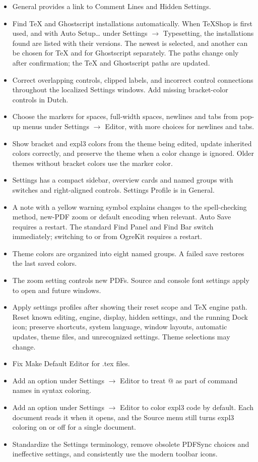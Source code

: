 \documentclass[11pt,letterpaper]{article}
\begin{document}
\begin{itemize}
\item General provides a link to Comment Lines and Hidden Settings.
\item Find TeX and Ghostscript installations automatically. When TeXShop is first used, and with Auto Setup… under Settings \(\rightarrow\) Typesetting, the installations found are listed with their versions. The newest is selected, and another can be chosen for TeX and for Ghostscript separately. The paths change only after confirmation; the TeX and Ghostscript paths are updated.
\item Correct overlapping controls, clipped labels, and incorrect control connections throughout the localized Settings windows. Add missing bracket-color controls in Dutch.
\item Choose the markers for spaces, full-width spaces, newlines and tabs from pop-up menus under Settings \(\rightarrow\) Editor, with more choices for newlines and tabs.
\item Show bracket and expl3 colors from the theme being edited, update inherited colors correctly, and preserve the theme when a color change is ignored. Older themes without bracket colors use the marker color.
\item Settings has a compact sidebar, overview cards and named groups with switches and right-aligned controls. Settings Profile is in General.
\item A note with a yellow warning symbol explains changes to the spell-checking method, new-PDF zoom or default encoding when relevant. Auto Save requires a restart. The standard Find Panel and Find Bar switch immediately; switching to or from OgreKit requires a restart.
\item Theme colors are organized into eight named groups. A failed save restores the last saved colors.
\item The zoom setting controls new PDFs. Source and console font settings apply to open and future windows.
\item Apply settings profiles after showing their reset scope and TeX engine path. Reset known editing, engine, display, hidden settings, and the running Dock icon; preserve shortcuts, system language, window layouts, automatic updates, theme files, and unrecognized settings. Theme selections may change.
\item Fix Make Default Editor for .tex files.
\item Add an option under Settings \(\rightarrow\) Editor to treat @ as part of command names in syntax coloring.
\item Add an option under Settings \(\rightarrow\) Editor to color expl3 code by default. Each document reads it when it opens, and the Source menu still turns expl3 coloring on or off for a single document.
\item Standardize the Settings terminology, remove obsolete PDFSync choices and ineffective settings, and consistently use the modern toolbar icons.
\end{itemize}
\end{document}
